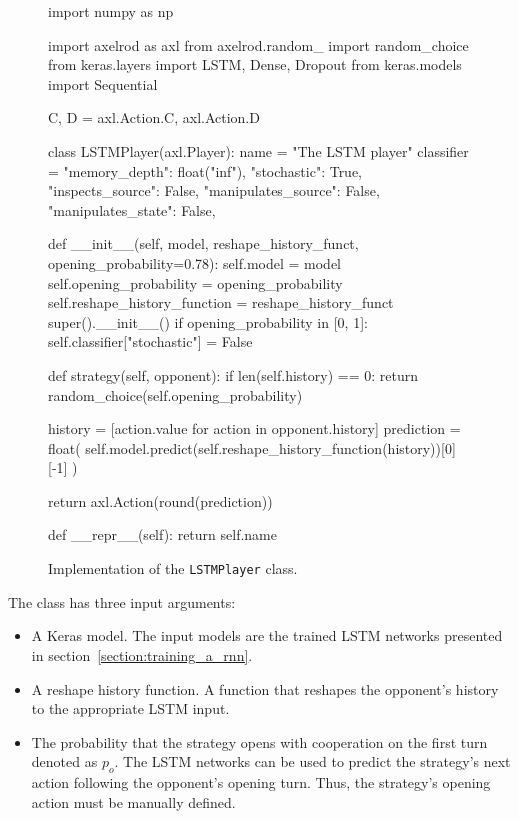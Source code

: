 \begin{figure}[!htbp]
    \begin{sourcepy}
    import numpy as np
    
    import axelrod as axl
    from axelrod.random_ import random_choice
    from keras.layers import LSTM, Dense, Dropout
    from keras.models import Sequential
    
    C, D = axl.Action.C, axl.Action.D
    
    class LSTMPlayer(axl.Player):
        name = "The LSTM player"
        classifier = {
            "memory_depth": float("inf"),
            "stochastic": True,
            "inspects_source": False,
            "manipulates_source": False,
            "manipulates_state": False,
        }
    
        def __init__(self, model, reshape_history_funct, opening_probability=0.78):
            self.model = model
            self.opening_probability = opening_probability
            self.reshape_history_function = reshape_history_funct
            super().__init__()
            if opening_probability in [0, 1]:
                self.classifier["stochastic"] = False
    
        def strategy(self, opponent):
            if len(self.history) == 0:
                return random_choice(self.opening_probability)
    
            history = [action.value for action in opponent.history]
            prediction = float(
                self.model.predict(self.reshape_history_function(history))[0][-1]
            )
    
            return axl.Action(round(prediction))
    
        def __repr__(self):
            return self.name
    \end{sourcepy}
    \caption{Implementation of the \texttt{LSTMPlayer} class.}\label{fig:lstm_player_source_code}
    \end{figure}

The class has three input arguments:

\begin{itemize}
    \item A Keras model. The input models are the \lstmnetworks trained LSTM networks
    presented in section~\ref{section:training_a_rnn}.
    \item A reshape history function. A function that reshapes the opponent's
    history to the appropriate LSTM input.
    \item The probability that the strategy opens with cooperation on the first turn denoted
    as \(p_o\). The LSTM networks can be used to predict the strategy's next
    action following the opponent's opening turn. Thus, the strategy's opening
    action must be manually defined.
\end{itemize}

